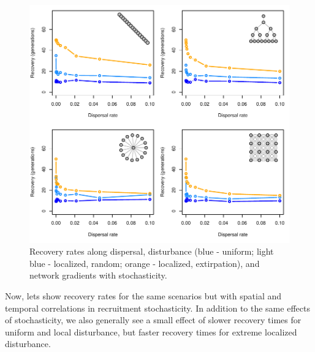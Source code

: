 \documentclass[]{article}
\begin{document}
\begin{figure}[H]

{\centering \includegraphics{Managing_for_ecological_surprises_in_metapopulations_makeHTML_files/figure-latex/stochastic recruitment-1} 

}

\caption{Recovery rates along dispersal, disturbance (blue - uniform; light blue - localized, random; orange - localized, extirpation), and network gradients with stochasticity.}\label{fig:stochastic recruitment}
\end{figure}

Now, lets show recovery rates for the same scenarios but with spatial
and temporal correlations in recruitment stochasticity. In addition to
the same effects of stochasticity, we also generally see a small effect
of slower recovery times for uniform and local disturbance, but faster
recovery times for extreme localized disturbance.
\end{document}
